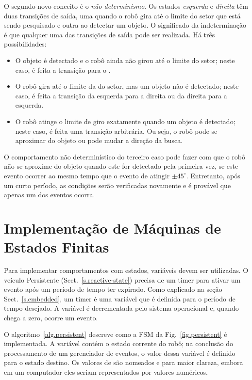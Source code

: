 O segundo novo conceito é o \emph{não determinismo}. Os estados \emph{esquerda} e \emph{direita} têm duas transições de saída, uma quando o robô gira até o limite do setor que está sendo pesquisado e outra ao detectar um objeto. O significado da indeterminação é que qualquer uma das transições de saída pode ser realizada. Há três possibilidades:
\begin{itemize}
\item O objeto é detectado e o robô ainda não girou até o limite do setor; neste caso, é feita a transição para o .
\item O robô gira até o limite da do setor, mas um objeto não é detectado; neste caso, é feita a transição da esquerda para a direita ou da direita para a esquerda.
\item O robô atinge o limite de giro exatamente quando um objeto é detectado; neste caso, é feita uma transição arbitrária. Ou seja, o robô pode se aproximar do objeto ou pode mudar a direção da busca.
\end{itemize}
O comportamento não determinístico do terceiro caso pode fazer com que o robô não se aproxime do objeto quando este for detectado pela primeira vez, se este evento ocorrer ao mesmo tempo que o evento de atingir $\pm45^{\circ}$. Entretanto, após um curto período, as condições serão verificadas novamente e é provável que apenas um dos eventos ocorra.





\section{Implementação de Máquinas de Estados Finitas}\label{s.fsm-implementation}

Para implementar comportamentos com estados, variáveis devem ser utilizadas. O veículo Persistente (Sect.~\ref{s.reactive-state}) precisa de um timer para ativar um evento após um período de tempo ter expirado. Como explicado na seção Sect.~\ref{s.embedded}, um timer é uma variável que é definida para o período de tempo desejado. A variável é decrementada pelo sistema operacional e, quando chega a zero, ocorre um evento.

O algoritmo~\ref{alg.persistent} descreve como a FSM da Fig.~\ref{fig.persistent} é implementada. A variável  contém o estado corrente do robô; na conclusão do processamento de um gerenciador de eventos, o valor dessa variável é definido para o estado destino. Os valores de  são nomeados  e  para maior clareza, embora em um computador eles seriam representados por valores numéricos.

